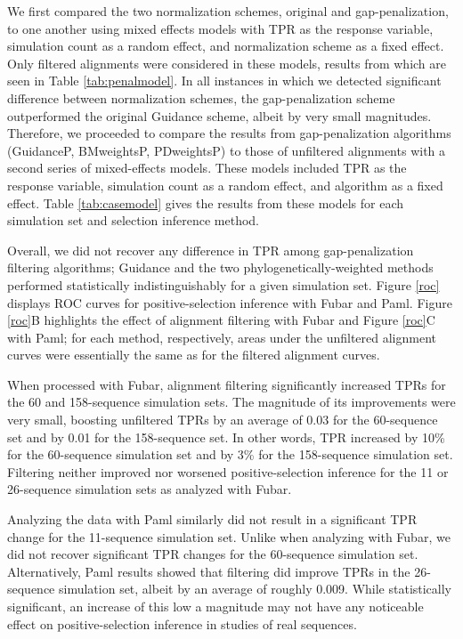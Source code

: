 \documentclass[10pt]{article}
\begin{document}
We first compared the two normalization schemes, original and gap-penalization, to one another using mixed effects models with TPR as the response variable, simulation count as a random effect, and normalization scheme as a fixed effect. Only filtered alignments were considered in these models, results from which are seen in Table \ref{tab:penalmodel}. In all instances in which we detected significant difference between normalization schemes, the gap-penalization scheme outperformed the original Guidance scheme, albeit by very small magnitudes. Therefore, we proceeded to compare the results from gap-penalization algorithms (GuidanceP, BMweightsP, PDweightsP) to those of unfiltered alignments with a second series of mixed-effects models. These models included TPR as the response variable, simulation count as a random effect, and algorithm as a fixed effect. Table \ref{tab:casemodel} gives the results from these models for each simulation set and selection inference method.

Overall, we did not recover any difference in TPR among gap-penalization filtering algorithms; Guidance and the two phylogenetically-weighted methods performed statistically indistinguishably for a given simulation set. Figure \ref{roc} displays ROC curves for positive-selection inference with Fubar and Paml. Figure \ref{roc}B highlights the effect of alignment filtering with Fubar and Figure \ref{roc}C with Paml; for each method, respectively, areas under the unfiltered alignment curves were essentially the same as for the filtered alignment curves.

When processed with Fubar, alignment filtering significantly increased TPRs for the 60 and 158-sequence simulation sets. The magnitude of its improvements were very small, boosting unfiltered TPRs by an average of 0.03 for the 60-sequence set and by 0.01 for the 158-sequence set. In other words, TPR increased by 10\% for the 60-sequence simulation set and by 3\% for the 158-sequence simulation set. Filtering neither improved nor worsened positive-selection inference for the 11 or 26-sequence simulation sets as analyzed with Fubar.

Analyzing the data with Paml similarly did not result in a significant TPR change for the 11-sequence simulation set. Unlike when analyzing with Fubar, we did not recover significant TPR changes for the 60-sequence simulation set. Alternatively, Paml results showed that filtering did improve TPRs in the 26-sequence simulation set, albeit by an average of roughly 0.009. While statistically significant, an increase of this low a magnitude may not have any noticeable effect on positive-selection inference in studies of real sequences. 
\end{document}
